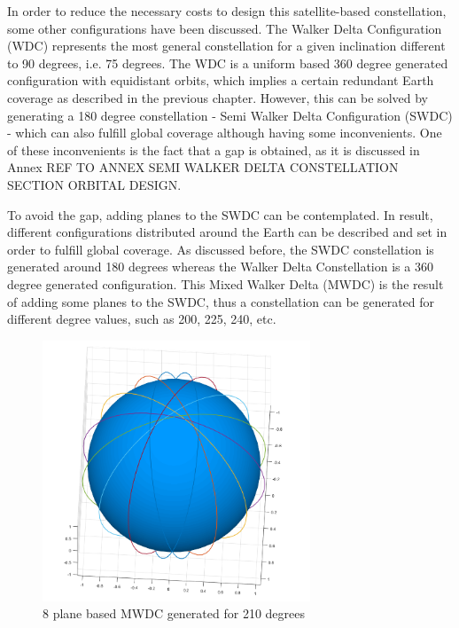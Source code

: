 In order to reduce the necessary costs to design this satellite-based constellation, some other configurations have been discussed. The Walker Delta Configuration (WDC) represents the most general constellation for a given inclination different to 90 degrees, i.e. 75 degrees. The WDC is a uniform based 360 degree generated configuration with equidistant orbits, which implies a certain redundant Earth coverage as described in the previous chapter. However, this can be solved by generating a 180 degree constellation - Semi Walker Delta Configuration (SWDC) - which can also fulfill global coverage although having some inconvenients. One of these inconvenients is the fact that a gap is obtained, as it is discussed in Annex REF TO ANNEX SEMI WALKER DELTA CONSTELLATION SECTION ORBITAL DESIGN.

To avoid the gap, adding planes to the SWDC can be contemplated. In result, different configurations distributed around the Earth can be described and set in order to fulfill global coverage. As discussed before, the SWDC constellation is generated around 180 degrees whereas the Walker Delta Constellation is a 360 degree generated configuration. This Mixed Walker Delta (MWDC) is the result of adding some planes to the SWDC, thus a constellation can be generated for different degree values, such as 200, 225, 240, etc. 

\begin{figure}[h]
\includegraphics[width=8cm]{MWDC}
\centering
\caption{8 plane based MWDC generated for 210 degrees}
\end{figure}
